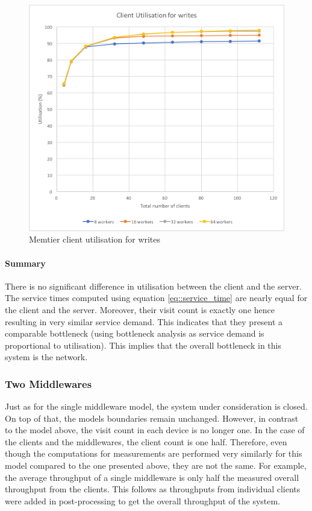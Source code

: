 \documentclass[11pt,a4paper]{article}
\begin{document}
\begin{figure}[!h]
\begin{minipage}[b]{.45\textwidth}
        \includegraphics[width=\textwidth]{processing/graphics/q_network_clt_util_1mw_writes.png}
        \caption{Memtier client utilisation for writes}
        \label{png::q_network_clt_util_1mw_writes}
    \end{minipage}
\end{figure}

\paragraph{Summary}
There is no significant difference in utilisation between the client and the server. The service times computed using equation \ref{eq::service_time} are nearly equal for the client and the server. Moreover, their visit count is exactly one hence resulting in very similar service demand. This indicates that they present a comparable bottleneck (using bottleneck analysis as service demand is proportional to utilisation). This implies that the overall bottleneck in this system is the network.


\subsubsection{Two Middlewares}
Just as for the single middleware model, the system under consideration is closed. On top of that, the models boundaries remain unchanged. However, in contrast to the model above, the visit count in each device is no longer one. In the case of the clients and the middlewares, the client count is one half. Therefore, even though the computations for measurements are performed very similarly for this model compared to the one presented above, they are not the same. For example, the average throughput of a single middleware is only half the measured overall throughput from the clients. This follows as throughputs from individual clients were added in post-processing to get the overall throughput of the system.
\end{document}
